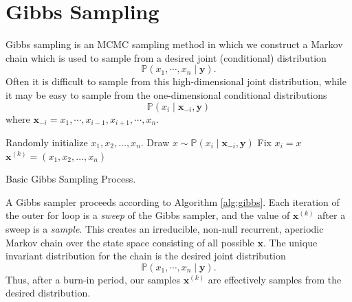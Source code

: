 \labdependencies{}

\section*{Gibbs Sampling}
Gibbs sampling is an MCMC sampling method in which we construct a Markov chain which is used to sample from a desired joint (conditional) distribution
\begin{equation*}
\mathbb{P}(x_{1},\cdots,x_{n} \mid \mathbf{y}).
\end{equation*}
Often it is difficult to sample from this high-dimensional joint distribution, while it may be easy to sample from the one-dimensional
conditional distributions
\begin{equation*}
\mathbb{P}(x_{i} \mid \mathbf{x}_{-i}, \mathbf{y})
\end{equation*}
where $\mathbf{x}_{-i} = x_{1},\cdots,x_{i-1},x_{i+1},\cdots,x_{n}.$

\begin{algorithm}
\begin{algorithmic}[1]
    \State \textrm{Randomly initialize } $x_1,x_2,\ldots,x_n$.
            \State \textrm{Draw } $x \sim \mathbb{P}(x_{i} \mid \mathbf{x}_{-i}, \mathbf{y})$
            \State \textrm{Fix } $x_i = x$
        \EndFor
        \State $\mathbf{x}^{(k)}= (x_1,x_2,\ldots,x_n)$
    \EndFor
\EndProcedure
\end{algorithmic}
\caption{Basic Gibbs Sampling Process.}
\label{alg:gibbs}
\end{algorithm}
A Gibbs sampler proceeds according to Algorithm \ref{alg:gibbs}.
Each iteration of the outer for loop is a \emph{sweep} of the Gibbs sampler, and the value of $\mathbf{x}^{(k)}$ after a sweep is a \emph{sample}.
This creates an irreducible, non-null recurrent, aperiodic Markov chain over the state space consisting of all possible $\mathbf{x}$.
The unique invariant distribution for the chain is the desired joint distribution
\begin{equation*}
\mathbb{P}(x_{1},\cdots,x_{n} \mid \mathbf{y}).
\end{equation*}
Thus, after a burn-in period, our samples $\mathbf{x}^{(k)}$ are effectively samples from the desired distribution.

